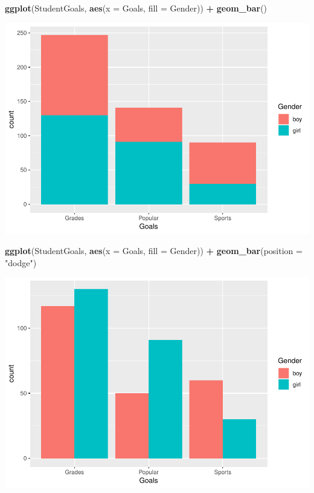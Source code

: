 \documentclass[]{article}
\newenvironment{Shaded}{\begin{snugshade}}{\end{snugshade}}
\newcommand{\KeywordTok}[1]{\textcolor[rgb]{0.13,0.29,0.53}{\textbf{#1}}}
\newcommand{\DataTypeTok}[1]{\textcolor[rgb]{0.13,0.29,0.53}{#1}}
\newcommand{\StringTok}[1]{\textcolor[rgb]{0.31,0.60,0.02}{#1}}
\newcommand{\OperatorTok}[1]{\textcolor[rgb]{0.81,0.36,0.00}{\textbf{#1}}}
\newcommand{\NormalTok}[1]{#1}
\begin{document}
\begin{Shaded}
\begin{Highlighting}[]
\KeywordTok{ggplot}\NormalTok{(StudentGoals, }\KeywordTok{aes}\NormalTok{(}\DataTypeTok{x =}\NormalTok{ Goals, }\DataTypeTok{fill =}\NormalTok{ Gender)) }\OperatorTok{+}\StringTok{ }\KeywordTok{geom_bar}\NormalTok{()}
\end{Highlighting}
\end{Shaded}

\includegraphics{stt-301-programming_files/figure-latex/unnamed-chunk-72-2.pdf}

\begin{Shaded}
\begin{Highlighting}[]
\KeywordTok{ggplot}\NormalTok{(StudentGoals, }\KeywordTok{aes}\NormalTok{(}\DataTypeTok{x =}\NormalTok{ Goals, }\DataTypeTok{fill =}\NormalTok{ Gender)) }\OperatorTok{+}
\StringTok{  }\KeywordTok{geom_bar}\NormalTok{(}\DataTypeTok{position =} \StringTok{"dodge"}\NormalTok{)}
\end{Highlighting}
\end{Shaded}

\includegraphics{stt-301-programming_files/figure-latex/unnamed-chunk-72-3.pdf}
\end{document}
